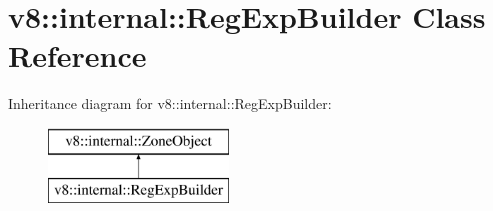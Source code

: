 \hypertarget{classv8_1_1internal_1_1_reg_exp_builder}{}\section{v8\+:\+:internal\+:\+:Reg\+Exp\+Builder Class Reference}
\label{classv8_1_1internal_1_1_reg_exp_builder}
Inheritance diagram for v8\+:\+:internal\+:\+:Reg\+Exp\+Builder\+:\begin{figure}[H]
\begin{center}
\leavevmode
\includegraphics[height=2.000000cm]{classv8_1_1internal_1_1_reg_exp_builder}
\end{center}
\end{figure}
